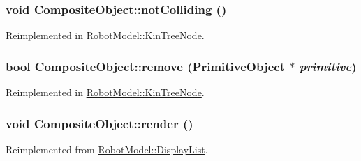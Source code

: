 \label{class_robot_model_1_1_composite_object_aa5b61818415089630ee37a3767b5c37c}
\hypertarget{class_robot_model_1_1_composite_object_a00db0d1a45893ef058e7abbad5083b6b}{
\subsubsection[{notColliding}]{\setlength{\rightskip}{0pt plus 5cm}void CompositeObject::notColliding ()}}
\label{class_robot_model_1_1_composite_object_a00db0d1a45893ef058e7abbad5083b6b}


Reimplemented in \hyperlink{class_robot_model_1_1_kin_tree_node_ae5d72a496f39cad4e266c11d75d4731c}{RobotModel::KinTreeNode}.\hypertarget{class_robot_model_1_1_composite_object_ac63de1955b6bda820d39c01616af8665}{
\subsubsection[{remove}]{\setlength{\rightskip}{0pt plus 5cm}bool CompositeObject::remove ({\bf PrimitiveObject} $\ast$ {\em primitive})}}
\label{class_robot_model_1_1_composite_object_ac63de1955b6bda820d39c01616af8665}


Reimplemented in \hyperlink{class_robot_model_1_1_kin_tree_node_ac87cf9db956705dcee63f4dbc01cc664}{RobotModel::KinTreeNode}.\hypertarget{class_robot_model_1_1_composite_object_aee43da74b22f6272736844effe7a1dd6}{
\subsubsection[{render}]{\setlength{\rightskip}{0pt plus 5cm}void CompositeObject::render ()}}
\label{class_robot_model_1_1_composite_object_aee43da74b22f6272736844effe7a1dd6}


Reimplemented from \hyperlink{class_robot_model_1_1_display_list_a5f95e85c192a2bc8f06f18075e6fefd7}{RobotModel::DisplayList}.

